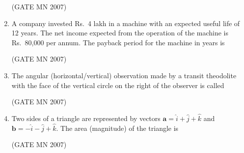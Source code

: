 \documentclass[journal]{IEEEtran}
\begin{document}
\begin{enumerate}
 \hfill (GATE MN 2007)

\item A company invested Rs.\ 4 lakh in a machine with an expected useful life of 12 years. The net income expected from the operation of the machine is Rs.\ 80,000 per annum. The payback period for the machine in years is
	
\begin{enumerate}
\end{enumerate}

 \hfill (GATE MN 2007)

\item The angular (horizontal/vertical) observation made by a transit theodolite with the face of the vertical circle on the right of the observer is called
\begin{enumerate}
\end{enumerate}


 \hfill (GATE MN 2007)



\item Two sides of a triangle are represented by vectors $\mathbf{a} = \hat{i} + \hat{j} + \hat{k}$ and $\mathbf{b} = -\hat{i} - \hat{j} + \hat{k}$. The area (magnitude) of the triangle is

\begin{enumerate}
\end{enumerate}

 \hfill (GATE MN 2007)


\end{enumerate}
\end{document}
